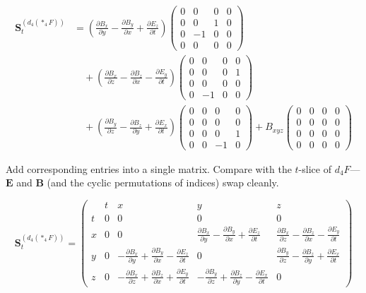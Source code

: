 \[
\begin{aligned}
\mathbf{S}_{t}^{(d_4(\ast_4F))}
&= \left(\frac{\partial B_x}{\partial y} - \frac{\partial B_y}{\partial x} + \frac{\partial E_z}{\partial t}\right)
\begin{pmatrix}0&0&0&0\\[2pt]0&0&1&0\\[2pt]0&-1&0&0\\[2pt]0&0&0&0\end{pmatrix} \\[10pt]
&\quad+ \left(\frac{\partial B_x}{\partial z} - \frac{\partial B_z}{\partial x} - \frac{\partial E_y}{\partial t}\right)
\begin{pmatrix}0&0&0&0\\[2pt]0&0&0&1\\[2pt]0&0&0&0\\[2pt]0&-1&0&0\end{pmatrix} \\[10pt]
&\quad+ \left(\frac{\partial B_y}{\partial z} - \frac{\partial B_z}{\partial y} + \frac{\partial E_x}{\partial t}\right)
\begin{pmatrix}0&0&0&0\\[2pt]0&0&0&0\\[2pt]0&0&0&1\\[2pt]0&0&-1&0\end{pmatrix}
{+} B_{xyz}
\begin{pmatrix}0&0&0&0\\[2pt]0&0&0&0\\[2pt]0&0&0&0\\[2pt]0&0&0&0\end{pmatrix}
\end{aligned}
\]

Add corresponding entries into a single matrix. Compare with the
\(t\)-slice of \(d_4F\)---\(\mathbf{E}\) and \(\mathbf{B}\) (and the
cyclic permutations of indices) swap cleanly.

\[
\mathbf{S}_{t}^{(d_4(\ast_4F))}
{=}
\left(\begin{array}{c|cccc}
 & t & x & y & z \\\hline
t & 0 & 0 & 0 & 0 \\[6pt]
x & 0 & 0 &
\displaystyle\frac{\partial B_x}{\partial y} {-} \frac{\partial B_y}{\partial x} {+} \frac{\partial E_z}{\partial t} &
\displaystyle\frac{\partial B_x}{\partial z} {-} \frac{\partial B_z}{\partial x} {-} \frac{\partial E_y}{\partial t} \\[14pt]
y & 0 &
\displaystyle{-}\frac{\partial B_x}{\partial y} {+} \frac{\partial B_y}{\partial x} {-} \frac{\partial E_z}{\partial t} &
0 &
\displaystyle\frac{\partial B_y}{\partial z} {-} \frac{\partial B_z}{\partial y} {+} \frac{\partial E_x}{\partial t} \\[14pt]
z & 0 &
\displaystyle{-}\frac{\partial B_x}{\partial z} {+} \frac{\partial B_z}{\partial x} {+} \frac{\partial E_y}{\partial t} &
\displaystyle{-}\frac{\partial B_y}{\partial z} {+} \frac{\partial B_z}{\partial y} {-} \frac{\partial E_x}{\partial t} &
0
\end{array}\right)
\]

